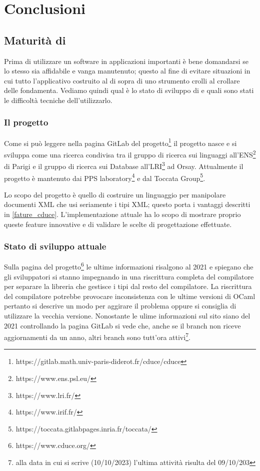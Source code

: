 \chapter{Conclusioni}
\section{Maturità di \cduce}
Prima di utilizzare un software in applicazioni importanti è bene domandarsi se lo stesso sia affidabile e vanga manutenuto; questo al fine di evitare situazioni in cui tutto l'applicativo costruito al di sopra di uno strumento crolli al crollare delle fondamenta. Vediamo quindi qual è lo stato di sviluppo di \cduce e quali sono stati le difficoltà tecniche dell'utilizzarlo.
\subsection{Il progetto \cduce}
Come si può leggere nella pagina GitLab del progetto\footnote{https://gitlab.math.univ-paris-diderot.fr/cduce/cduce} il progetto nasce e si sviluppa come una ricerca condivisa tra il gruppo di ricerca sui linguaggi all'ENS\footnote{https://www.ens.psl.eu/} di Parigi e il gruppo di ricerca sui Database all'LRI\footnote{https://www.lri.fr/} ad Orsay. Attualmente il progetto è mantenuto dai PPS laboratory\footnote{https://www.irif.fr/} e dal  Toccata Group\footnote{https://toccata.gitlabpages.inria.fr/toccata/}.

Lo scopo del progetto è quello di costruire un linguaggio per manipolare documenti XML che usi seriamente i tipi XML; questo porta i vantaggi descritti in \ref{fature_cduce}. L'implementazione attuale ha lo scopo di mostrare proprio queste feature innovative e di validare le scelte di progettazione effettuate.
\subsection{Stato di sviluppo attuale}
Sulla pagina del progetto\footnote{https://www.cduce.org/} le ultime informazioni risalgono al 2021 e spiegano che gli sviluppatori si stanno impegnando in una riscrittura completa del compilatore per separare la libreria che gestisce i tipi dal resto del compilatore. La riscrittura del compilatore potrebbe provocare inconsistenza con le ultime versioni di OCaml pertanto si descrive un modo per aggirare il problema oppure si consiglia di utilizzare la vecchia versione. Nonostante le ulime informazioni sul sito siano del 2021 controllando la pagina GitLab si vede che, anche se il branch  non riceve aggiornamenti da un anno, altri branch sono tutt'ora attivi\footnote{alla data in cui si scrive (10/10/2023) l'ultima attività risulta del 09/10/203}.

